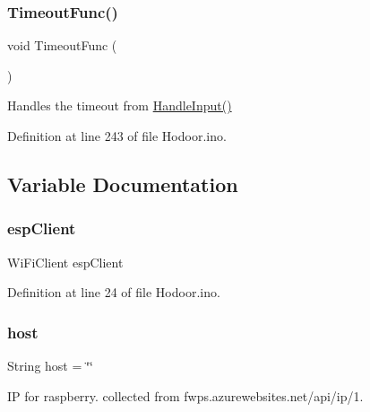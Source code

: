 \mbox{\label{_hodoor_8ino_a419e6b0415908250d60da1a336370405}} 
\subsubsection{\texorpdfstring{Timeout\+Func()}{TimeoutFunc()}}
{\footnotesize\ttfamily void Timeout\+Func (\begin{DoxyParamCaption}{ }\end{DoxyParamCaption})}



Handles the timeout from \mbox{\hyperlink{_hodoor_8ino_a98675754ce81a9e1a94fa2835d88d9d3}{Handle\+Input()}} 



Definition at line 243 of file Hodoor.\+ino.



\subsection{Variable Documentation}
\mbox{\label{_hodoor_8ino_abd77e757e4b3bb6f1e4b42b21ea9e040}} 
\subsubsection{\texorpdfstring{esp\+Client}{espClient}}
{\footnotesize\ttfamily Wi\+Fi\+Client esp\+Client}



Definition at line 24 of file Hodoor.\+ino.

\mbox{\label{_hodoor_8ino_a2502b12b30261ef4dea2ff97a6b78cab}} 
\subsubsection{\texorpdfstring{host}{host}}
{\footnotesize\ttfamily String host = \char`\"{}\char`\"{}}



IP for raspberry. collected from fwps.\+azurewebsites.\+net/api/ip/1. 



